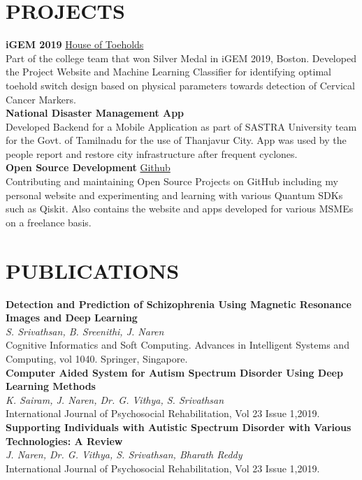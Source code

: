 \documentclass[a4paper,9pt]{extarticle}
\begin{document}
\section*{PROJECTS}
\noindent
\textbf{iGEM 2019} \hfill \href{https://2019.igem.org/Team:SASTRA_Thanjavur}{House of Toeholds \faExternalLink}\\[1pt]
Part of the college team that won Silver Medal in iGEM 2019, Boston. Developed the Project Website and Machine Learning
Classifier for identifying optimal toehold switch design based on physical parameters towards detection of Cervical Cancer
Markers.\\

\noindent
\textbf{National Disaster Management App}\\[1pt]
Developed Backend for a Mobile Application as part of SASTRA University team for the Govt. of Tamilnadu for the use of
Thanjavur City. App was used by the people report and restore city infrastructure after frequent cyclones.\\

\noindent
\textbf{Open Source Development} \hfill \href{https://github.com/vathzen}{ Github \faExternalLink}\\[1pt]
Contributing and maintaining Open Source Projects on GitHub including my personal website and experimenting and learning with various Quantum SDKs such as Qiskit. Also contains
the website and apps developed for various MSMEs on a freelance basis.

\section*{PUBLICATIONS}
\noindent
\textbf{Detection and Prediction of Schizophrenia Using Magnetic Resonance Images and Deep Learning}\\[1pt]
\textit{S. Srivathsan, B. Sreenithi, J. Naren}\\[1pt]
Cognitive Informatics and Soft Computing. Advances in Intelligent Systems and Computing, vol 1040. Springer, Singapore.\\

\noindent
\textbf{Computer Aided System for Autism Spectrum Disorder Using Deep Learning Methods}\\[1pt]
\textit{K. Sairam, J. Naren, Dr. G. Vithya, S. Srivathsan}\\[1pt]
International Journal of Psychosocial Rehabilitation, Vol 23 Issue 1,2019.\\

\noindent
\textbf{Supporting Individuals with Autistic Spectrum Disorder with Various Technologies: A Review}\\[1pt]
\textit{J. Naren, Dr. G. Vithya, S. Srivathsan, Bharath Reddy}\\[1pt]
International Journal of Psychosocial Rehabilitation, Vol 23 Issue 1,2019.\\
\end{document}
